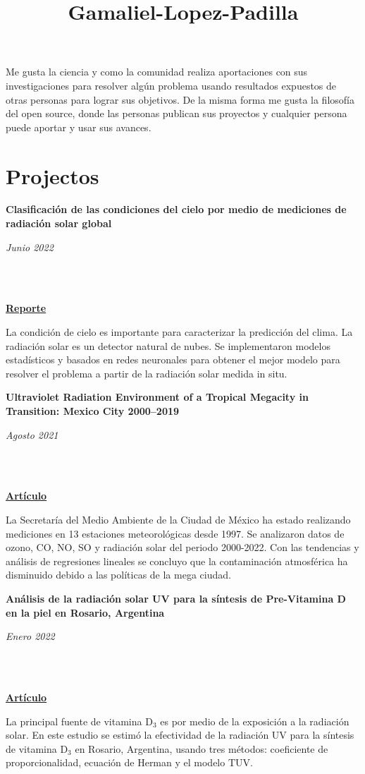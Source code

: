 \documentclass[a3paper]{adcv_color}
\title{Gamaliel-Lopez-Padilla}
\newcommand{\proyect}[3]{\begin{minipage}{1\linewidth}
    \begin{minipage}{0.8\linewidth}
      \textbf{#1}
    \end{minipage}
    \begin{minipage}{0.19\linewidth}
      \begin{flushright}
        \vspace{#3cm}
        \textit{#2}
      \end{flushright}
    \end{minipage}\\
  \end{minipage}
  \vspace{0.1cm}\\
}
\begin{document}
\changefontsizes{15.5pt}

Me gusta la ciencia y como la comunidad realiza  aportaciones con sus investigaciones para resolver algún problema usando resultados expuestos de otras personas para lograr sus objetivos. De la misma forma me gusta la filosofía del open source, donde las personas publican sus proyectos y cualquier persona puede aportar y usar sus avances.

\section{Projectos}
\begin{multicols}{2}

  \proyect{Clasificación de las condiciones del cielo por medio de mediciones de radiación solar global}{Junio 2022}{-0.8}
  \href{https://github.com/giovannilopez9808/Cloud_classification/raw/main/Document/Main.pdf}{\textbf{Reporte}}

  La condición de cielo es importante para caracterizar la predicción del clima. La radiación solar es un detector natural de nubes. Se implementaron modelos estadísticos y basados en redes neuronales para obtener el mejor modelo para resolver el problema a partir de la radiación solar medida in situ.

  \proyect{Ultraviolet Radiation Environment of a Tropical Megacity in Transition: Mexico City 2000–2019}{Agosto 2021}{-0.6}
  \href{https://pubs.acs.org/doi/10.1021/acs.est.0c08515}{\textbf{Artículo}}

  La Secretaría del Medio Ambiente de la Ciudad de México ha estado realizando mediciones en 13 estaciones meteorológicas desde 1997. Se analizaron datos de ozono, CO, NO, SO y radiación solar del periodo 2000-2022. Con las tendencias y análisis de regresiones lineales  se concluyo que la contaminación atmosférica ha disminuido debido a las políticas de la mega ciudad.


  \proyect{Análisis de la radiación solar UV para la síntesis de Pre-Vitamina D en la piel en Rosario, Argentina}{Enero 2022}{-0.8}
  \href{https://anales.fisica.org.ar/journal/index.php/analesafa/article/view/2318}{\textbf{Artículo}}

  La principal fuente de vitamina D$_3$ es por medio de la exposición a la radiación solar.  En este estudio se estimó la efectividad de la radiación UV para la síntesis de vitamina D$_3$ en Rosario, Argentina, usando tres métodos: coeficiente de proporcionalidad, ecuación de Herman y el modelo TUV.\\


\end{multicols}
\end{document}
